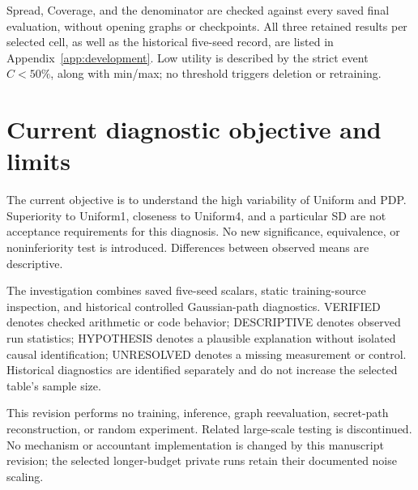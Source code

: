 Spread, Coverage, and the denominator are checked against every saved final evaluation, without opening graphs or checkpoints. All three retained results per selected cell, as well as the historical five-seed record, are listed in Appendix~\ref{app:development}. Low utility is described by the strict event $C<50\%$, along with min/max; no threshold triggers deletion or retraining.

\section{Current diagnostic objective and limits}
The current objective is to understand the high variability of Uniform and PDP. Superiority to Uniform1, closeness to Uniform4, and a particular SD are not acceptance requirements for this diagnosis. No new significance, equivalence, or noninferiority test is introduced. Differences between observed means are descriptive.

The investigation combines saved five-seed scalars, static training-source inspection, and historical controlled Gaussian-path diagnostics. VERIFIED denotes checked arithmetic or code behavior; DESCRIPTIVE denotes observed run statistics; HYPOTHESIS denotes a plausible explanation without isolated causal identification; UNRESOLVED denotes a missing measurement or control. Historical diagnostics are identified separately and do not increase the selected table's sample size.

This revision performs no training, inference, graph reevaluation, secret-path reconstruction, or random experiment. Related large-scale testing is discontinued. No mechanism or accountant implementation is changed by this manuscript revision; the selected longer-budget private runs retain their documented noise scaling.

